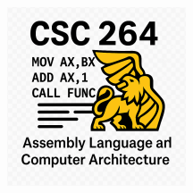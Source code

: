 \documentclass[letterpaper,12pt]{exam}
\begin{document}
\vfill
\begin{center}
\includegraphics{../csc264Logo}
\end{center}
\end{document}
